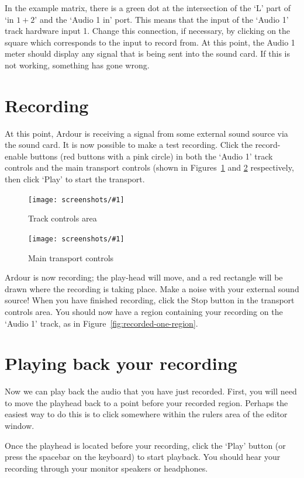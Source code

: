 \documentclass[10pt,a4paper]{book}
\newcommand{\screenshot}[3]{%
\begin{figure}[ht]%
\begin{center}
\texttt{[image: screenshots/\#1]}
\end{center}
\caption{#2}
\label{#3}
\end{figure}}
\begin{document}
In the example matrix, there is a green dot at the intersection of the
`L' part of `in $1+2$' and the `Audio 1 in' port.  This means that the
input of the `Audio 1' track hardware input 1.  Change this
connection, if necessary, by clicking on the square which corresponds
to the input to record from.  At this point, the Audio 1 meter should
display any signal that is being sent into the sound card.  If this is
not working, something has gone wrong.

\section{Recording}

At this point, Ardour is receiving a signal from some external sound
source via the sound card.  It is now possible to make a test
recording.  Click the record-enable buttons (red buttons with a pink
circle) in both the `Audio 1' track controls and the main transport
controls (shown in Figures~\ref{fig:track-controls} and
\ref{fig:transport-controls} respectively, then click `Play' to start
the transport.

\screenshot{track-controls.png}{Track controls area}{fig:track-controls}
\screenshot{transport-controls.png}{Main transport controls}{fig:transport-controls}

Ardour is now recording; the play-head will move, and a red rectangle
will be drawn where the recording is taking place.  Make a noise with
your external sound source!  When you have finished recording, click
the Stop button in the transport controls area.  You should now have a
region containing your recording on the `Audio 1' track, as in
Figure~\ref{fig:recorded-one-region}.


\section{Playing back your recording}

Now we can play back the audio that you have just recorded.  First,
you will need to move the playhead back to a point before your
recorded region.  Perhaps the easiest way to do this is to click
somewhere within the rulers area of the editor window.


Once the playhead is located before your recording, click the `Play'
button (or press the spacebar on the keyboard) to start playback.  You
should hear your recording through your monitor speakers or
headphones.
\end{document}
